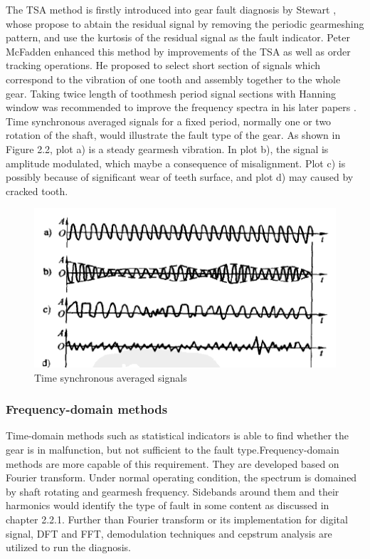 The TSA method is firstly introduced into gear fault diagnosis by Stewart \cite{stewart}, whose propose to abtain the residual signal by removing the periodic gearmeshing pattern, and use the kurtosis of the residual signal as the fault indicator. Peter McFadden \cite{mc2} enhanced this method by improvements of the TSA as well as order tracking operations. He proposed to select short section of signals which correspond to the vibration of one tooth and assembly together to the whole gear. Taking twice length of toothmesh period signal sections with Hanning window was recommended to improve the frequency spectra in his later papers \cite{mc3}. Time synchronous averaged signals for a fixed period, normally one or two rotation of the shaft, would illustrate the fault type of the gear. As shown in Figure 2.2, plot a) is a steady gearmesh vibration. In plot b), the signal is amplitude modulated, which maybe a consequence of misalignment. Plot c) is possibly because of significant wear of teeth surface, and plot d) may caused by cracked tooth.

\begin{figure}
	\centering
	\includegraphics{TSA}
	\caption{Time synchronous averaged signals \cite{chen}}
	\label{tsa}
\end{figure}


\subsubsection{Frequency-domain methods}

Time-domain methods such as statistical indicators is able to find whether the gear is in malfunction, but not sufficient to the fault type.Frequency-domain methods are more capable of this requirement. They are developed based on Fourier transform. Under normal operating condition, the spectrum is domained by shaft rotating and gearmesh frequency. Sidebands around them and their harmonics would identify the type of fault in some content as discussed in chapter 2.2.1.
Further than Fourier transform or its implementation for digital signal, DFT and FFT, demodulation techniques and cepstrum analysis are utilized to run the diagnosis.

